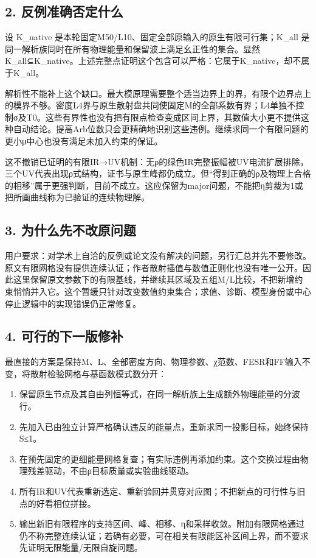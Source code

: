 \documentclass[
  11pt,
  a4paper,
]{article}
\providecommand{\tightlist}{%
  \setlength{\itemsep}{0pt}\setlength{\parskip}{0pt}}
\begin{document}
\subsection{2.
反例准确否定什么}\label{ux53cdux4f8bux51c6ux786eux5426ux5b9aux4ec0ux4e48}

设 K\_native 是本轮固定M50/L10、固定全部原输入的原生有限可行集；K\_all
是同一解析族同时在所有物理能量和保留波上满足幺正性的集合。显然
K\_all⊆K\_native。上述完整点证明这个包含可以严格：它属于K\_native，却不属于K\_all。

解析性不能补上这个缺口。最大模原理需要整个适当边界上的界，有限个边界点上的模界不够。密度L4界与原生散射盘共同使固定M的全部系数有界；L4单独不控制σ及T0。这些有界性也没有把有限点检查变成区间上界，其数值大小更不提供这种自动结论。提高Arb位数只会更精确地识别这些违例。继续求同一个有限问题的更小μ中心也没有满足未加入约束的保证。

这不撤销已证明的有限IR→UV机制：无ρ的绿色IR完整振幅被UV电流扩展排除，三个UV代表出现ρ式结构，证书与原生峰都仍成立。但``得到正确的ρ及物理上合格的相移''属于更强判断，目前不成立。这应保留为major问题，不能把η剪裁为1或把所画曲线称为已验证的连续物理解。

\subsection{3.
为什么先不改原问题}\label{ux4e3aux4ec0ux4e48ux5148ux4e0dux6539ux539fux95eeux9898}

用户要求：对学术上自洽的反例或论文没有解决的问题，另行汇总并先不要修改。原文有限网格没有提供连续认证；作者散射插值与数值正则化也没有唯一公开。因此这里保留原文参数下的有限基线，并继续其区域及五组M/L比较，不把新增约束悄悄并入它。这个暂缓只针对改变数值约束集合；求值、诊断、模型身份或中心停止逻辑中的实现错误仍正常修复。

\subsection{4.
可行的下一版修补}\label{ux53efux884cux7684ux4e0bux4e00ux7248ux4feeux8865}

最直接的方案是保持M、L、全部密度方向、物理参数、χ范数、FESR和FF输入不变，将散射检验网格与基函数模式数分开：

\begin{enumerate}
\def\labelenumi{\arabic{enumi}.}
\tightlist
\item
  保留原生节点及其自由列恒等式，在同一解析族上生成额外物理能量的分波行。
\item
  先加入已由独立计算严格确认违反的能量点，重新求同一投影目标，始终保持\textbar S\textbar≤1。
\item
  在预先固定的更细能量网格复查；有实际违例再添加约束。这个交换过程由物理残差驱动，不由ρ目标质量或实验曲线驱动。
\item
  所有IR和UV代表重新选定、重新验回并贯穿对应图；不把新点的可行性与旧点的好看相位拼接。
\item
  输出新旧有限程序的支持区间、峰、相移、η和采样收敛。附加有限网格通过仍不称完整连续认证；若确有必要，可在相关有限能区补区间上界，而不要求先证明无限能量/无限自旋问题。
\end{enumerate}
\end{document}
